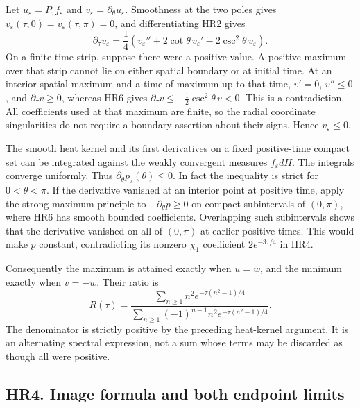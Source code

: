 \documentclass[11pt]{article}
\begin{document}
Let \(u_\varepsilon=P_\tau f_\varepsilon\) and
\(v_\varepsilon=\partial_\theta u_\varepsilon\). Smoothness at the
two poles gives \(v_\varepsilon(\tau,0)=v_\varepsilon(\tau,\pi)=0\),
and differentiating HR2 gives
\[
 \partial_\tau v_\varepsilon
 =\frac14(v_\varepsilon''+2\cot\theta\,v_\varepsilon'
                         -2\csc^2\theta\,v_\varepsilon).       \tag{HR6}
\]
On a finite time strip, suppose there were a positive value. A
positive maximum over that strip cannot lie on either spatial
boundary or at initial time. At an interior spatial maximum and
a time of maximum up to that time, \(v'=0\), \(v''\le0\), and
\(\partial_\tau v\ge0\), whereas HR6 gives
\(\partial_\tau v\le-\tfrac12\csc^2\theta\,v<0\).
This is a contradiction. All coefficients used at that maximum are
finite, so the radial coordinate singularities do not require a
boundary assertion about their signs. Hence \(v_\varepsilon\le0\).

The smooth heat kernel and its first derivatives on a fixed
positive-time compact set can be integrated against the weakly
convergent measures \(f_\varepsilon dH\). The integrals converge
uniformly. Thus \(\partial_\theta p_\tau(\theta)\le0\).
In fact the inequality is strict for \(0<\theta<\pi\). If the
derivative vanished at an interior point at positive time, apply
the strong maximum principle to \(-\partial_\theta p\ge0\) on
compact subintervals of \((0,\pi)\), where HR6 has smooth bounded
coefficients. Overlapping such subintervals shows that the
derivative vanished on all of \((0,\pi)\) at earlier positive
times. This would make \(p\) constant, contradicting its nonzero
\(\chi_1\) coefficient \(2e^{-3\tau/4}\) in HR4.

Consequently the maximum is attained exactly when \(u=w\), and
the minimum exactly when \(v=-w\). Their ratio is
\[
 R(\tau)=
 \frac{\displaystyle\sum_{n\ge1}n^2e^{-\tau(n^2-1)/4}}
      {\displaystyle\sum_{n\ge1}(-1)^{n-1}n^2e^{-\tau(n^2-1)/4}}.
                                                               \tag{HR7}
\]
The denominator is strictly positive by the preceding heat-kernel
argument. It is an alternating spectral expression, not a sum
whose terms may be discarded as though all were positive.

\subsection*{HR4. Image formula and both endpoint limits}
\end{document}
